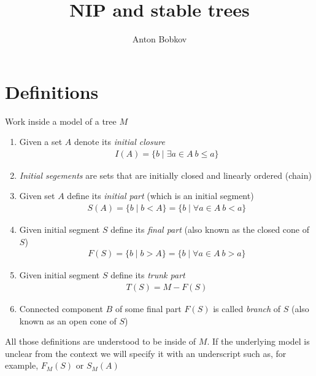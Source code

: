 \documentclass{amsart}
\begin{document}
\title{NIP and stable trees}
\author{Anton Bobkov}

\maketitle

\section{Definitions}

\begin{Definition} Work inside a model of a tree $M$
	\begin{enumerate}
		\item Given a set $A$ denote its \emph{initial closure} 
		\begin{align*}
			I(A) = \{b \mid \exists a \in A \ b \leq a\}
		\end{align*}
		\item \emph{Initial segements} are sets that are initially closed and linearly ordered (chain)
		\item Given set $A$ define its \emph{initial part} (which is an initial segment)
		\begin{align*}
			S(A) = \{b \mid b < A\} = \{b \mid \forall a \in A \ b < a\}
		\end{align*}
		\item Given initial segment $S$ define its \emph{final part} (also known as the closed cone of $S$)
		\begin{align*}
			F(S) = \{b \mid b > A\} = \{b \mid \forall a \in A \ b > a\}
		\end{align*}
		\item Given initial segment $S$ define its \emph{trunk part}
		\begin{align*}
			T(S) = M - F(S)
		\end{align*}
		\item Connected component $B$ of some final part $F(S)$ is called \emph{branch} of $S$ (also known as an open cone of $S$)
	\end{enumerate}
	All those definitions are understood to be inside of $M$. If the underlying model is unclear from the context we will specify it with an underscript such as, for example, $F_M(S)$ or $S_M(A)$
\end{Definition}
\end{document}
